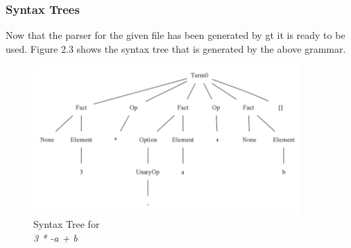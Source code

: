 \subsubsection{Syntax Trees}


Now that the parser for the given file has been generated by gt it is ready to be used. 
Figure 2.3 shows the syntax tree that is generated by the above grammar.
%
%
%
\begin{figure}[h!]
  \centering
  \includegraphics[width=4in]{./examples/ebnf/arith/ebnf-arith.png}
  \caption{Syntax Tree for\\ \textit{3 * -a + b}}
\end{figure}